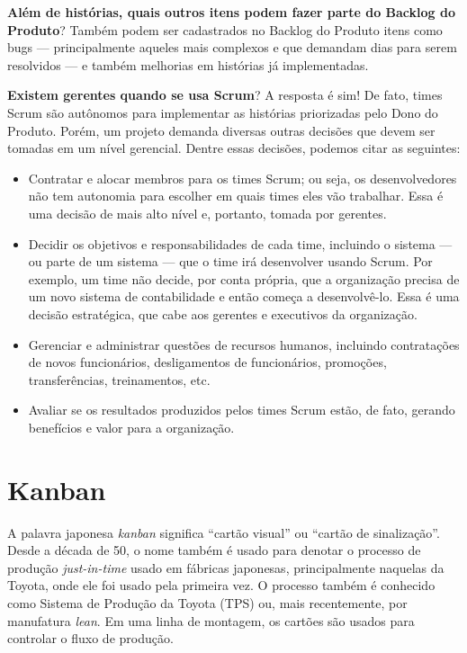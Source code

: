 \documentclass[
  11pt,
  twoside]{book}
\begin{document}
\textbf{Além de histórias, quais outros itens podem fazer parte do
Backlog do Produto}? Também podem ser cadastrados no Backlog do Produto
itens como bugs --- principalmente aqueles mais complexos e que demandam
dias para serem resolvidos --- e também melhorias em histórias já
implementadas.

\textbf{Existem gerentes quando se usa Scrum}? A resposta é sim! De
fato, times Scrum são autônomos para implementar as histórias
priorizadas pelo Dono do Produto. Porém, um projeto demanda diversas
outras decisões que devem ser tomadas em um nível gerencial. Dentre
essas decisões, podemos citar as seguintes:

\begin{itemize}
\item
  Contratar e alocar membros para os times Scrum; ou seja, os
  desenvolvedores não tem autonomia para escolher em quais times eles
  vão trabalhar. Essa é uma decisão de mais alto nível e, portanto,
  tomada por gerentes.
\item
  Decidir os objetivos e responsabilidades de cada time, incluindo o
  sistema --- ou parte de um sistema --- que o time irá desenvolver
  usando Scrum. Por exemplo, um time não decide, por conta própria, que
  a organização precisa de um novo sistema de contabilidade e então
  começa a desenvolvê-lo. Essa é uma decisão estratégica, que cabe aos
  gerentes e executivos da organização.
\item
  Gerenciar e administrar questões de recursos humanos, incluindo
  contratações de novos funcionários, desligamentos de funcionários,
  promoções, transferências, treinamentos, etc.
\item
  Avaliar se os resultados produzidos pelos times Scrum estão, de fato,
  gerando benefícios e valor para a organização.
\end{itemize}

\hypertarget{kanban}{%
\section{Kanban}\label{kanban}}

  A palavra japonesa \emph{kanban} significa
``cartão visual'' ou ``cartão de sinalização''. Desde a década de 50, o
nome também é usado para denotar o processo de produção
\emph{just-in-time} usado em fábricas japonesas, principalmente naquelas
da Toyota, onde ele foi usado pela primeira vez. O processo também é
conhecido como Sistema de Produção da Toyota (TPS) ou, mais
recentemente, por manufatura \emph{lean}. Em uma linha de montagem, os
cartões são usados para controlar o fluxo de produção.
\end{document}
